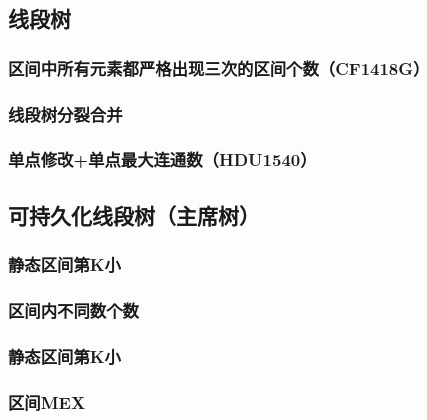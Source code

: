 \documentclass{article}
\begin{document}
\subsection{线段树}
\subsubsection{区间中所有元素都严格出现三次的区间个数（CF1418G）}

\subsubsection{线段树分裂合并}

\subsubsection{单点修改+单点最大连通数（HDU1540）}


\subsection{可持久化线段树（主席树）}
\subsubsection{静态区间第K小}

\subsubsection{区间内不同数个数}

\subsubsection{静态区间第K小}

\subsubsection{区间MEX}

\end{document}
